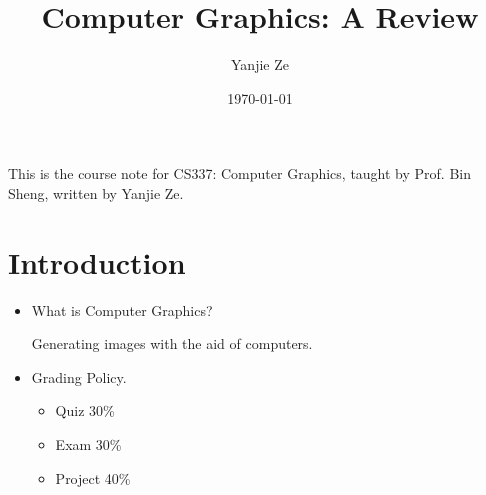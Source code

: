 \documentclass{article}
\title{Computer Graphics: A Review}
\author{Yanjie Ze }
\date{\today}
\begin{document}
\maketitle
This is the course note for CS337: Computer Graphics, taught by Prof. Bin Sheng, written by Yanjie Ze. 

\section{Introduction}
\begin{itemize}
    \item What is Computer Graphics?
    
    Generating images with the aid of computers.
    
    \item Grading Policy.
    
    \begin{itemize}
        \item Quiz 30\%
        \item Exam 30\%
        \item Project 40\%
    \end{itemize}
\end{itemize}
\end{document}
